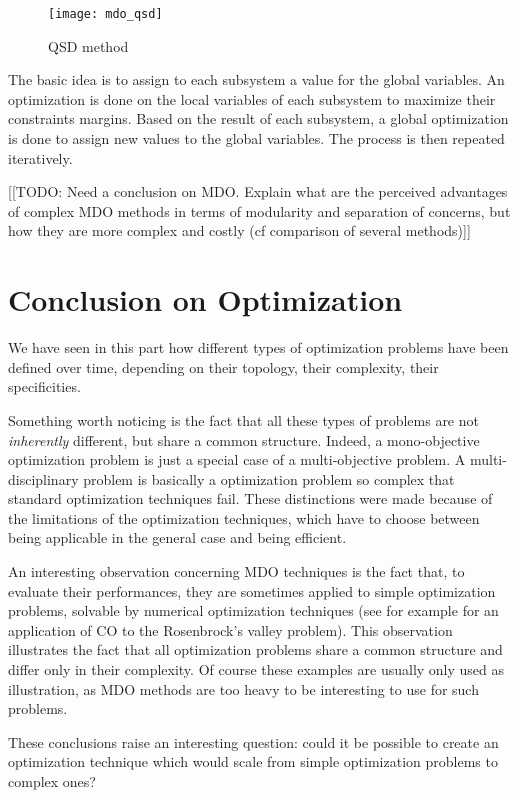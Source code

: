 \begin{wrapfigure}{r}{0.5\textwidth}
\centering
\texttt{[image: mdo\_qsd]}
\caption{QSD method}\label{qsd_graph}
\end{wrapfigure}

The basic idea is to assign to each subsystem a value for the global variables. An optimization is done on the local variables of each subsystem to maximize their constraints margins. Based on the result of each subsystem, a global optimization is done to assign new values to the global variables. The process is then repeated iteratively.

[[TODO: Need a conclusion on MDO. Explain what are the perceived advantages of complex MDO methods in terms of modularity and separation of concerns, but how they are more complex and costly (cf comparison of several methods)]]

\chapter{Conclusion on Optimization}

We have seen in this part how different types of optimization problems have been defined over time, depending on their topology, their complexity, their specificities.

Something worth noticing is the fact that all these types of problems are not \emph{inherently} different, but share a common structure. Indeed, a mono-objective optimization problem is just a special case of a multi-objective problem. A multi-disciplinary problem is basically a optimization problem so complex that standard optimization techniques fail. These distinctions were made because of the limitations of the optimization techniques, which have to choose between being applicable in the general case and being efficient.

An interesting observation concerning MDO techniques is the fact that, to evaluate their performances, they are sometimes applied to simple optimization problems, solvable by numerical optimization techniques (see for example \cite{Kroo:1994:MOM} for an application of CO to the Rosenbrock's valley problem). This observation illustrates the fact that all optimization problems share a common structure and differ only in their complexity. Of course these examples are usually only used as illustration, as MDO methods are too heavy to be interesting to use for such problems.

These conclusions raise an interesting question: could it be possible to create an optimization technique which would scale from simple optimization problems to complex ones?

